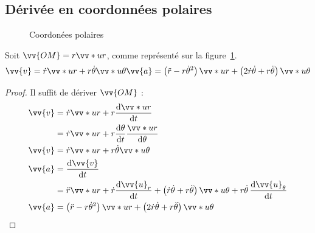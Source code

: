 \documentclass[11pt,a4paper,fleqn,pdftex]{report}
\begin{document}
\subsection{Dérivée en coordonnées polaires} %
\label{ssub:derivee_en_coord_polaire}
\begin{figure}[!h]
   \centering
\caption{Coordonées polaires}
\label{fig:coord_polaires}
\end{figure}
\begin{itheorem}
Soit $\vv{OM} = r\vv*{u}{r}$, comme représenté sur la figure~\ref{fig:coord_polaires}.
   \begin{equation}
    \vv{v} = \dot{r}\vv*{u}{r} + r \dot{\theta}\vv*{u}{\theta} \\
    \vv{a} = \left( \ddot{r} - r\dot{\theta}^2\right)\vv*{u}{r} + \left( 2\dot{r}\dot{\theta} + r\ddot{\theta} \right) \vv*{u}{\theta}
   \end{equation}
\end{itheorem}
\begin{proof}
   Il suffit de dériver $\vv{OM}$ : 
   \begin{align*}
      \vv{v}&= \dot{r}\vv*{u}{r} + r \dfrac{\d \vv*{u}{r}}{\d t} \\
            &= \dot{r}\vv*{u}{r} + r \dfrac{\d \theta}{\d t} \dfrac{\vv*{u}{r}}{\d \theta} \\
      \vv{v}&= \dot{r}\vv*{u}{r} + r \dot{\theta}\vv*{u}{\theta} \\
      \vv{a}&=\dfrac{\d\vv{v}}{\d t} \\
            &=\ddot{r}\vv*{u}{r}+\dot{r}\dfrac{\d\vv{u}_r}{\d t}+ \left( \dot{r}\dot{\theta}+r\ddot{\theta} \right)\vv*{u}{\theta}+r\dot{\theta}\,\dfrac{\d\vv{u}_\theta}{\d t} \\
      \vv{a}&= \left( \ddot{r} - r\dot{\theta}^2\right)\vv*{u}{r} + \left( 2\dot{r}\dot{\theta} + r\ddot{\theta} \right) \vv*{u}{\theta}
   \end{align*}
\end{proof}
\end{document}
